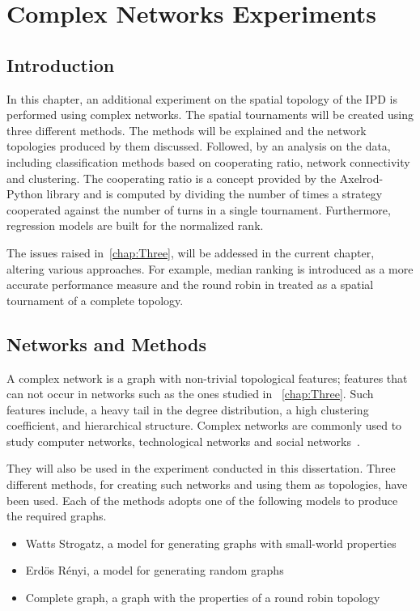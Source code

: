 \chapter{Complex Networks Experiments}
\label{chap:Four}

\section{Introduction}
In this chapter, an additional experiment on the spatial topology of the IPD
is performed using complex networks. The spatial tournaments will be created using
three different methods. The methods will be explained and the network topologies produced by them
discussed. Followed, by an analysis on the data, including classification methods
based on cooperating ratio, network connectivity and clustering. The cooperating
ratio is a concept provided by the Axelrod-Python library and is computed
by dividing the number of times a strategy cooperated against the number of turns
in a single tournament. Furthermore, regression models are built for the normalized rank.

The issues raised in~\autoref{chap:Three}, will be addessed in the current chapter,
altering various approaches. For example, median ranking is introduced as a more
accurate performance measure and the round robin in treated as a spatial tournament
of a complete topology.

\section{Networks and Methods}
\label{sub:methods}
A complex network is a graph with non-trivial topological features;
features that can not occur in networks such as the ones studied in ~\autoref{chap:Three}.
Such features include, a heavy tail in the degree distribution, a high
clustering coefficient, and hierarchical structure. Complex networks are commonly
used to study computer networks, technological networks and social networks~\cite{VanDerHofstad2009}.

They will also be used in the experiment conducted in this dissertation. Three
different methods, for creating such networks and using them as topologies, have
been used. Each of the methods adopts one of the following models to produce the
required graphs.

\begin{itemize}
	\item Watts Strogatz, a model for generating graphs with small-world properties\cite{Watts1998}
	\item Erd\"{o}s R\'{e}nyi, a model for generating random graphs~\cite{Erdos1959}
	\item Complete graph, a graph with the properties of a round robin topology\cite{Harris2010}
\end{itemize}

